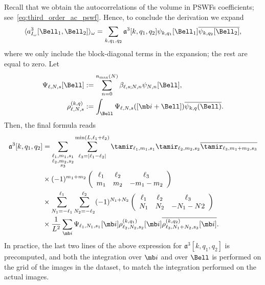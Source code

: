 \documentclass[9pt,twocolumn,twoside,lineno]{pnas-new}
\begin{document}
Recall that we obtain the autocorrelations of the volume in PSWFs coefficients; see~\eqref{eq:third_order_ac_pswf}. Hence, to conclude the derivation we expand
\[ \langle a^3_{I_{\omega}}[\Bell_1, \Bell_2]\rangle_{\omega}= \sum_{k,q_1,q_2}\mathfrak{a}^3[k,q_1,q_2]\psi_{k,q_1}[\Bell_1]\overline{\psi_{k,q_2}[\Bell_2]},\]
where we only include the block-diagonal terms in the expansion; the rest are equal to zero. Let
\begin{align*}
\Psi_{\ell,N,s}[\Bell] &:= \sum_{n=0}^{n_{\text{max}}(N)}\beta_{\ell,s;N,n}\psi_{N,n}[\Bell],\\ 
\rho_{\ell,N,s}^{(k,q)}&:=\int_{\Bell}\Psi_{\ell,N,s}([\mb i+\Bell])\overline{\psi_{k,q}(\Bell)}.
\end{align*}
Then, 
the final formula reads
\[\begin{aligned} \mathfrak{a}^3[k,q_1,q_2] &= \sum_{\substack{\ell_1,m_1,s_1\\\ell_2,m_2,s_2\\s_3}}\sum_{\ell_3=|\ell_1-\ell_2|}^{\min(L,\ell_1+\ell_2)}\tamir_{\ell_1,m_1,s_1}\tamir_{\ell_2,m_2,s_2}\overline{\tamir_{\ell_3,m_1+m_2,s_3}}\\
&\times (-1)^{m_1+m_2}\left(\begin{array}{ccc}\ell_1 & \ell_2  & \ell_3\\ m_1 & m_2 & -m_1-m_2\end{array}\right)\\
&\times \sum_{N_1=-\ell_1}^{\ell_1}\sum_{N_2=-\ell_2}^{\ell_2}(-1)^{N_1+N_2}\left(\begin{array}{ccc}\ell_1 & \ell_2  & \ell_3\\ N_1 & N_2 & -N_1-N2\end{array}\right)\\&\times\frac{1}{L^2}\sum_{\mb i}\Psi_{\ell_1,N_1,s_1}[\mb i]\rho_{\ell_2,N_2,s_2}^{(k,q_1)}[\mb i]\overline{\rho_{\ell_3,N_1+N_2,s_3}^{(k,q_2)}[\mb i]}. \end{aligned}\]
In practice, the last two lines of the above expression for $\mathfrak{a}^3[k,q_1,q_2]$ is precomputed, and both the integration over $\mb i$ and over $\Bell$ is performed on the grid of the images in the dataset, to match the integration performed on the actual images.

\end{document}
